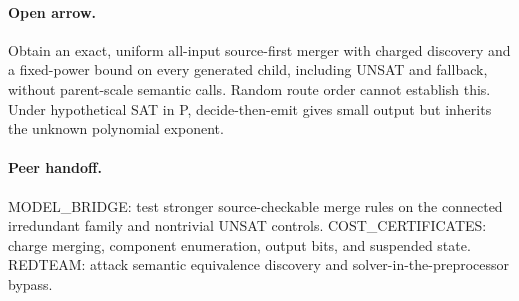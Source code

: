 \documentclass{article}
\begin{document}
\paragraph{Open arrow.} Obtain an exact, uniform all-input source-first merger with charged discovery and a fixed-power bound on every generated child, including UNSAT and fallback, without parent-scale semantic calls. Random route order cannot establish this. Under hypothetical SAT in P, decide-then-emit gives small output but inherits the unknown polynomial exponent.
\paragraph{Peer handoff.} MODEL_BRIDGE: test stronger source-checkable merge rules on the connected irredundant family and nontrivial UNSAT controls. COST_CERTIFICATES: charge merging, component enumeration, output bits, and suspended state. REDTEAM: attack semantic equivalence discovery and solver-in-the-preprocessor bypass.
\end{document}
